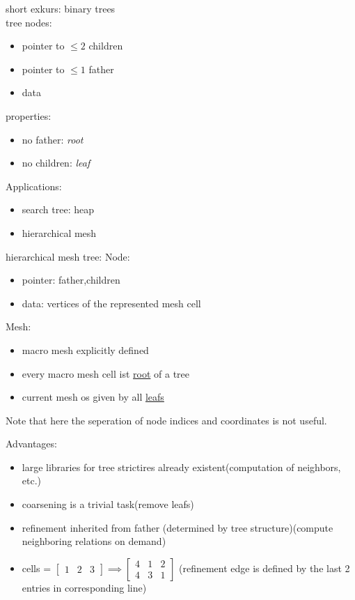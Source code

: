 short exkurs: binary trees\\
tree nodes:
\begin{itemize}
	\item pointer to $\leq 2$ children
	\item pointer to $\leq 1$ father
	\item data
	
\end{itemize}
properties:
\begin{itemize}
	\item no father: \textit{root}
	\item no children: \textit{leaf}
\end{itemize}

Applications:
\begin{itemize}
	\item search tree: heap
	\item hierarchical mesh
\end{itemize}

hierarchical mesh tree:
Node:
\begin{itemize}
	\item pointer: father,children
	\item data: vertices of the represented mesh cell
\end{itemize}

Mesh:
\begin{itemize}
	\item macro mesh explicitly defined
	\item every macro mesh cell ist \underline{root} of a tree
	\item current mesh os given by all \underline{leafs}
	
\end{itemize}

Note that here the seperation of node indices and coordinates is not useful.\vspace{1cm}

Advantages:
\begin{itemize}
	\item large libraries for tree strictires already existent(computation of neighbors, etc.)
	\item coarsening is a trivial task(remove leafs)
	\item refinement inherited from father (determined by tree structure)(compute neighboring relations \glqq on demand\grqq)
	
	\item cells = 
	$\begin{bmatrix}
	1 & 2 & 3
	\end{bmatrix} \implies 
	\begin{bmatrix}
	4 & 1 & 2\\
	4 & 3 & 1
	\end{bmatrix} $ (refinement edge is defined by the last 2 entries in corresponding line)
\end{itemize}

